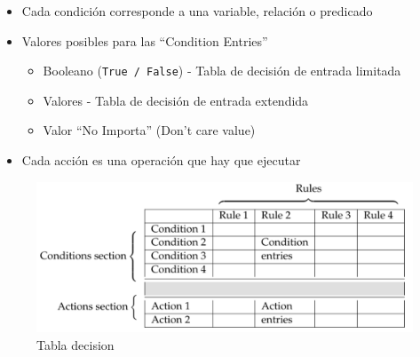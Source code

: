 \begin{paracol}{2}
   \begin{itemize}
   	\item Cada condición corresponde a una variable, relación o predicado
	\item Valores posibles para las ``Condition Entries''
 \begin{itemize}
 	\item Booleano (\lstinline|True / False|) - Tabla de decisión de entrada limitada
	\item Valores - Tabla de decisión de entrada extendida
	\item Valor ``No Importa'' (Don't care value)

 \end{itemize}
\item Cada acción es una operación que hay que ejecutar

   \end{itemize}
\switchcolumn
\begin{figure}[htbp]
   \centering
   \includegraphics{images/05/tabladecision.png}
   \caption{Tabla decision }
   \label{fig:05/tabladecision}
\end{figure}
\end{paracol}

